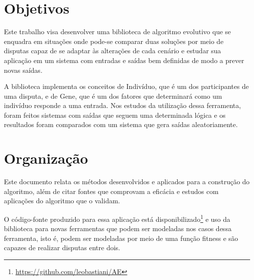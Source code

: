 \section{Objetivos}

Este trabalho visa desenvolver uma biblioteca de algoritmo evolutivo que se enquadra em situações onde pode-se comparar duas soluções por meio de disputas capaz de se adaptar às alterações de cada cenário e estudar sua aplicação em um sistema com entradas e saídas bem definidas de modo a prever novas saídas.

A biblioteca implementa os conceitos de Indivíduo, que é um dos participantes de uma disputa, e de Gene, que é um dos fatores que determinará como um indivíduo responde a uma entrada. Nos estudos da utilização dessa ferramenta, foram feitos sistemas com saídas que seguem uma determinada lógica e os resultados foram comparados com um sistema que gera saídas aleatoriamente.

\section{Organização}

Este documento relata os métodos desenvolvidos e aplicados para a construção do algoritmo, além de citar fontes que comprovam a eficácia e estudos com aplicações do algoritmo que o validam.

O código-fonte produzido para essa aplicação está disponibilizado\footnote{\url{https://github.com/leobastiani/AE}} e uso da biblioteca para novas ferramentas que podem ser modeladas nos casos dessa ferramenta, isto é, podem ser modeladas por meio de uma função fitness e são capazes de realizar disputas entre dois.
